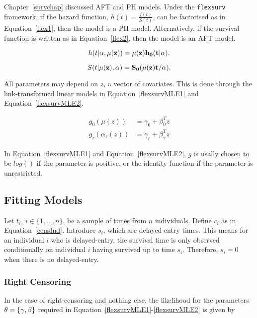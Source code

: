 Chapter~\ref{survchap} discussed AFT and PH models. Under the \verb|flexsurv| framework, if the hazard function, $h(t) = \frac{f(t)}{S(t)}$, can be factorised as in Equation~\ref{flex1}, then the model is a PH model. Alternatively, if the survival function is written as in Equation~\ref{flex2}, then the model is an AFT model.

\begin{equation}
    h(t|\bf{\alpha}, \mu(z)) = \mu(z)h_0(t|\alpha). 
    \label{flex1}
\end{equation}

\begin{equation}
    S(t|\mu(\bf{z}), \bf{\alpha}) = S_0(\mu(\bf{z})t/\bf{\alpha}).  
    \label{flex2}
\end{equation}

All parameters may depend on $z$, a vector of covariates. This is done through the link-transformed linear models in Equation~\ref{flexsurvMLE1} and Equation~\ref{flexsurvMLE2}.

\begin{align}
    g_0(\mu(z)) &= \gamma_0 + \beta_0^Tz \label{flexsurvMLE1}\\
    g_r(\alpha_r(z)) &= \gamma_r + \beta_{\gamma}^Tz \label{flexsurvMLE2}
\end{align}

In Equation~\ref{flexsurvMLE1} and Equation~\ref{flexsurvMLE2}, $g$ is usally chosen to be $log()$ if the parameter is positive, or the identity function if the parameter is unrestricted.

\subsection{Fitting Models}
Let $t_i$, $i \in \{1, \ldots, n\}$, be a sample of times from $n$ individuals. Define $c_i$ as in Equation~\ref{censInd}. Introduce $s_i$, which are delayed-entry times. This means for an individual $i$ who is delayed-entry, the survival time is only observed conditionally on individual $i$ having survived up to time $s_i$. Therefore, $s_i = 0$ when there is no delayed-entry. 

\subsubsection{Right Censoring}
In the case of right-censoring and nothing else, the likelihood for the parameters $\bf{\theta} = \{\bf{\gamma}, \bf{\beta}\}$ required in Equation~\ref{flexsurvMLE1}-\ref{flexsurvMLE2} is given by 

